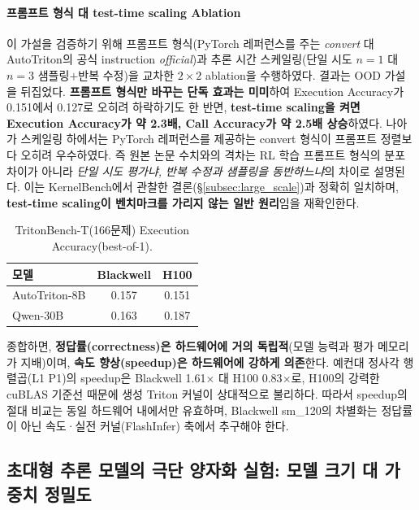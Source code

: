 \documentclass[sigplan,screen,review,anonymous]{acmart}
\begin{document}
\paragraph{프롬프트 형식 대 test-time scaling Ablation}
이 가설을 검증하기 위해 프롬프트 형식(PyTorch 레퍼런스를 주는 \emph{convert} 대 AutoTriton의 공식 instruction \emph{official})과 추론 시간 스케일링(단일 시도 $n{=}1$ 대 $n{=}3$ 샘플링$+$반복 수정)을 교차한 $2\times2$ ablation을 수행하였다. 결과는 OOD 가설을 뒤집었다. \textbf{프롬프트 형식만 바꾸는 단독 효과는 미미}하여 Execution Accuracy가 0.151에서 0.127로 오히려 하락하기도 한 반면, \textbf{test-time scaling을 켜면 Execution Accuracy가 약 2.3배, Call Accuracy가 약 2.5배 상승}하였다. 나아가 스케일링 하에서는 PyTorch 레퍼런스를 제공하는 convert 형식이 프롬프트 정렬보다 오히려 우수하였다. 즉 원본 논문 수치와의 격차는 RL 학습 프롬프트 형식의 분포 차이가 아니라 \emph{단일 시도 평가냐, 반복 수정과 샘플링을 동반하느냐}의 차이로 설명된다. 이는 KernelBench에서 관찰한 결론(\S\ref{subsec:large_scale})과 정확히 일치하며, \textbf{test-time scaling이 벤치마크를 가리지 않는 일반 원리}임을 재확인한다.

\begin{table}[t]
\centering
\caption{TritonBench-T(166문제) Execution Accuracy(best-of-1).}
\label{tab:tritonbench}
\begin{tabular}{lcc}
\toprule
\textbf{모델} & \textbf{Blackwell} & \textbf{H100} \\
\midrule
AutoTriton-8B & 0.157 & 0.151 \\
Qwen-30B      & 0.163 & 0.187 \\
\bottomrule
\end{tabular}
\end{table}

종합하면, \textbf{정답률(correctness)은 하드웨어에 거의 독립적}(모델 능력과 평가 메모리가 지배)이며, \textbf{속도 향상(speedup)은 하드웨어에 강하게 의존}한다. 예컨대 정사각 행렬곱(L1 P1)의 speedup은 Blackwell 1.61$\times$ 대 H100 0.83$\times$로, H100의 강력한 cuBLAS 기준선 때문에 생성 Triton 커널이 상대적으로 불리하다. 따라서 speedup의 절대 비교는 동일 하드웨어 내에서만 유효하며, Blackwell sm\_120의 차별화는 정답률이 아닌 속도·실전 커널(FlashInfer) 축에서 추구해야 한다.

\subsection{초대형 추론 모델의 극단 양자화 실험: 모델 크기 대 가중치 정밀도}
\label{subsec:glm_quant}
\end{document}
